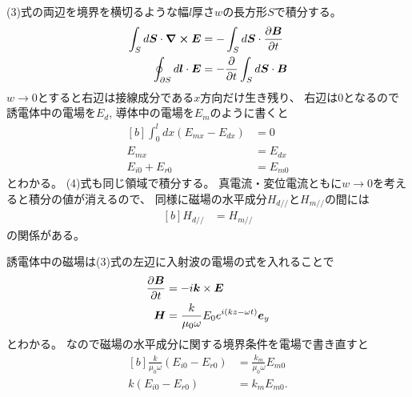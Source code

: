 \documentclass[../../master.tex]{subfiles}
\begin{document}
\subsection{}
(3)式の両辺を境界を横切るような幅\(l\)厚さ\(w\)の長方形\(S\)で積分する。
\begin{equation}\begin{aligned}[b]
    \int_{S}d \vb*{S}\cdot \curl{\vb*{E}} &= -\int_{S}d \vb*{S}\cdot \pdv{\vb*{B}}{t}\\
    \oint_{\partial S}d \vb*{l}\cdot \vb*{E} &= -\pdv{t} \int_{S}d \vb*{S}\cdot \vb*{B}
\end{aligned}\end{equation}
\(w\to0\)とすると右辺は接線成分である\(x\)方向だけ生き残り、
右辺は0となるので誘電体中の電場を\(E_d\), 導体中の電場を\(E_m\)のように書くと
\begin{equation}\begin{aligned}[b]
    \int_{0}^{l}dx (E_{mx}-E_{dx})&=0\\
    E_{mx} &= E_{dx}\\
    E_{i0}+E_{r0} &= E_{m0}
\end{aligned}\end{equation}
とわかる。
(4)式も同じ領域で積分する。
真電流・変位電流ともに\(w\to0\)を考えると積分の値が消えるので、
同様に磁場の水平成分\(H_{d//}\)と\(H_{m//}\)の間には
\begin{equation}\begin{aligned}[b]
    H_{d//} &= H_{m//}
\end{aligned}\end{equation}
の関係がある。

誘電体中の磁場は(3)式の左辺に入射波の電場の式を入れることで
\begin{equation}\begin{aligned}[b]
    \pdv{\vb*{B}}{t} &= - i \vb*{k}\times \vb*{E}\\
    \vb*{H} &= \frac{k}{\mu_0 \omega} E_{0}e^{i(kz-\omega t)} \vb*{e}_y
\end{aligned}\end{equation}
とわかる。
なので磁場の水平成分に関する境界条件を電場で書き直すと
\begin{equation}\begin{aligned}[b]
    \frac{k}{\mu_0 \omega}(E_{i0}-E_{r0}) &= \frac{k_m}{\mu_0 \omega}E_{m0}\\
    k(E_{i0}-E_{r0}) &= k_m E_{m0}.
\end{aligned}\end{equation}
\end{document}
